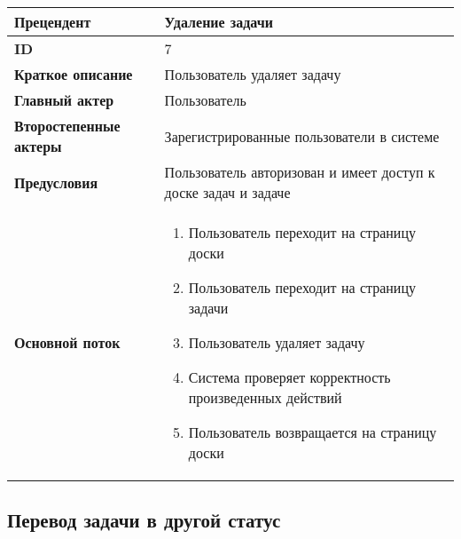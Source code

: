 \documentclass[14pt,a4paper]{extarticle}
\begin{document}
\begin{tabular}{|l|p{9cm}|}
	\hline
	\textbf{Прецендент}            & Удаление задачи                                              		     \\
	\hline
	\textbf{ID}                    & 7                                                                           \\
	\hline
	\textbf{Краткое описание}      & Пользователь удаляет задачу                				     \\
	\hline
	\textbf{Главный актер}         & Пользователь                                                                \\
	\hline
	\textbf{Второстепенные актеры} & Зарегистрированные пользователи в системе                                   \\
	\hline
	\textbf{Предусловия}           & Пользователь авторизован и имеет доступ к доске задач и задаче              \\
	\hline
	\textbf{Основной поток}        & \begin{enumerate}
		                                 \item Пользователь переходит на страницу доски
		                                 \item Пользователь переходит на страницу задачи
						 \item Пользователь удаляет задачу
		                                 \item Система проверяет корректность произведенных действий
						 \item Пользователь возвращается на страницу доски
	                                 \end{enumerate} \\
	\hline
\end{tabular}

\subsection{Перевод задачи в другой статус}
\end{document}
